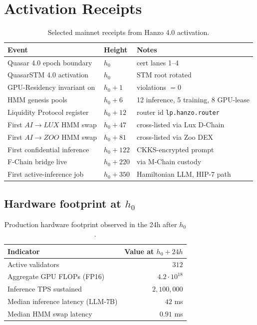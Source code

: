 \documentclass[11pt,letterpaper]{article}
\begin{document}
\section{Activation Receipts}
\label{sec:receipts}

\begin{table}[H]
\centering
\small
\begin{tabular}{lll}
\toprule
\textbf{Event} & \textbf{Height} & \textbf{Notes} \\
\midrule
Quasar 4.0 epoch boundary & $h_0$ & cert lanes 1--4 \\
QuasarSTM 4.0 activation & $h_0$ & STM root rotated \\
GPU-Residency invariant on & $h_0 + 1$ & violations $= 0$ \\
HMM genesis pools & $h_0 + 6$ & 12 inference, 5 training, 8 GPU-lease \\
Liquidity Protocol register & $h_0 + 12$ & router id \texttt{lp.hanzo.router} \\
First $AI \to LUX$ HMM swap & $h_0 + 47$ & cross-listed via Lux D-Chain \\
First $AI \to ZOO$ HMM swap & $h_0 + 81$ & cross-listed via Zoo DEX \\
First confidential inference & $h_0 + 122$ & CKKS-encrypted prompt \\
F-Chain bridge live & $h_0 + 220$ & via M-Chain custody \\
First active-inference job & $h_0 + 350$ & Hamiltonian LLM, HIP-7 path \\
\bottomrule
\end{tabular}
\caption{Selected mainnet receipts from Hanzo 4.0 activation.}
\end{table}

\subsection{Hardware footprint at $h_0$}

\begin{table}[H]
\centering
\small
\begin{tabular}{lr}
\toprule
\textbf{Indicator} & \textbf{Value at $h_0 + 24h$} \\
\midrule
Active validators & $312$ \\
Aggregate GPU FLOPs (FP16) & $4.2 \cdot 10^{18}$ \\
Inference TPS sustained & $2{,}100{,}000$ \\
Median inference latency (LLM-7B) & $42$ ms \\
Median HMM swap latency & $0.91$ ms \\
\bottomrule
\end{tabular}
\caption{Production hardware footprint observed in the 24h after
$h_0$.}
\end{table}
\end{document}
